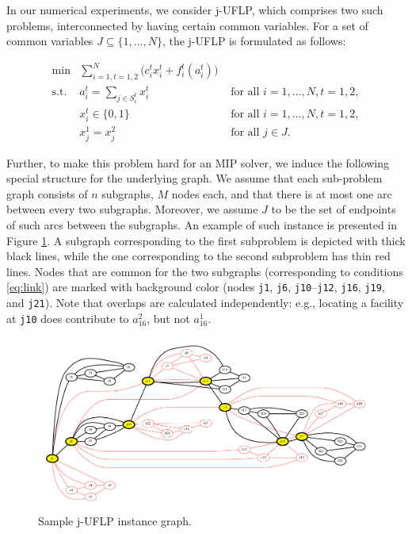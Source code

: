 \documentclass[11pt]{article}
\begin{document}
In our numerical experiments, we consider j-UFLP, which comprises two such
problems, interconnected by having certain common variables. For a set of common
variables  \(J\subseteq\{1,\ldots,N\}\), the j-UFLP is formulated as follows:

\begin{subequations}\label{eq:j-UFLP}
\begin{align}\tag{j-UFLP}
  \min & \sum_{i=1, t=1,2}^N \Big(c^t_i x^t_i + f^t_i(a^t_i)\Big)&\\
    \textrm{s.t. } & a^t_i = \sum_{j\in S^t_i} x^t_i& \textrm{ for all } i=1,\ldots, N, t=1,2,\\
    & x^t_i\in\{0,1\} & \textrm{ for all } i=1,\ldots,N, t=1,2,\\
    & x^1_j = x^2_j & \textrm{ for all } j\in J.\label{eq:link}
\end{align}
\end{subequations}

Further, to make this problem hard for an MIP solver, we induce the following
special structure for the underlying graph. We assume that each sub-problem
graph consists of \(n\) subgraphs, \(M\) nodes each, and that there is at most one
arc between every two subgraphs. Moreover, we assume \(J\) to be the set of
endpoints of such arcs between the subgraphs. An example of such instance is
presented in Figure \ref{fig:sample-jUFLP}. A subgraph corresponding to the first
subproblem is depicted with thick black lines, while the one corresponding to
the second subproblem has thin red lines. Nodes that are common for the two
subgraphs (corresponding to conditions \eqref{eq:link}) are marked with background
color (nodes \texttt{j1}, \texttt{j6}, \texttt{j10}--\texttt{j12}, \texttt{j16}, \texttt{j19}, and \texttt{j21}). Note that
overlaps are calculated independently: e.g., locating a facility at \texttt{j10} does
contribute to \(a_{16}^2\), but not \(a_{16}^1\).

  \begin{figure}%
    \centering
    \includegraphics[width=\textwidth]{./sample_jUFLP.pdf}%
    \caption{Sample j-UFLP instance graph.}%
    \label{fig:sample-jUFLP}%
\end{figure}
\end{document}
